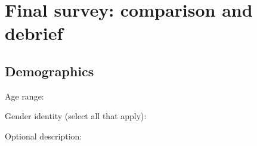 \section{Final survey: comparison and debrief}
\subsection{Demographics}
\par\medskip\noindent
Age range:
\par\nopagebreak {}
\par\medskip\noindent
Gender identity (select all that apply):
\par\nopagebreak {}\par\nopagebreak\noindent{}\par Optional description:\surveywrite
